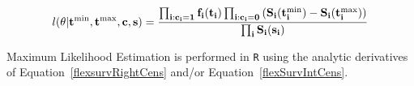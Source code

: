 \begin{equation}
    \label{flexSurvIntCens}
    l(\bf{\theta}|\bf{t^\text{min}}, \bf{t^\text{max}}, \bf{c},\bf{s}) = \frac{\prod_{i:c_i=1} f_i(t_i) \prod_{i:c_i=0} \left(S_i(t_i^{\text{min}}) - S_i(t_i^{\text{max}}) \right)}{\prod_{i} S_i(s_i)}
\end{equation}

Maximum Likelihood Estimation is performed in \verb|R| using the analytic derivatives of Equation~\ref{flexsurvRightCens} and/or Equation~\ref{flexSurvIntCens}. 

